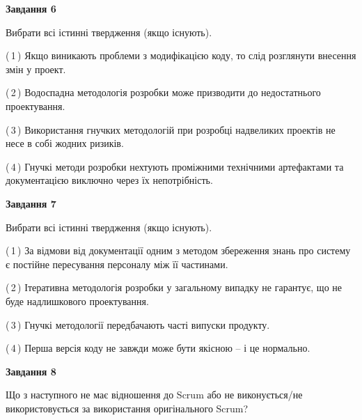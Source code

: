 \documentclass[10pt, ukrainian]{article}
\begin{document}
{\begin {large}
{\begin {center}\textbf{Завдання 6}\end {center}}\par
Вибрати всі істинні твердження (якщо існують).\par
\vspace{2mm}



(\,1\,) Якщо виникають проблеми з модифікацією коду, то слід розглянути внесення змін у проект. %



(\,2\,) Водоспадна методологія розробки може призводити до недостатнього проектування. %



(\,3\,) Використання гнучких методологій при розробці надвеликих проектів не несе в собі жодних ризиків. %



(\,4\,) Гнучкі методи розробки нехтують проміжними технічними артефактами та документацією виключно через їх непотрібність. %


{\begin {center}\textbf{Завдання 7}\end {center}}\par
Вибрати всі істинні твердження (якщо існують).\par
\vspace{2mm}



(\,1\,) За відмови від документації одним з методом збереження знань про систему є постійне пересування персоналу між її частинами. %



(\,2\,) Ітеративна методологія розробки у загальному випадку не гарантує, що не буде надлишкового проектування. %



(\,3\,) Гнучкі методології передбачають часті випуски продукту. %



(\,4\,) Перша версія коду не завжди може бути якісною -- і це нормально. %


{\begin {center}\textbf{Завдання 8}\end {center}}\par
Що з наступного не має відношення до Scrum або не виконується/не використовується за використання оригінального Scrum?\par
\vspace{2mm}




\end{large}}
\end{document}
